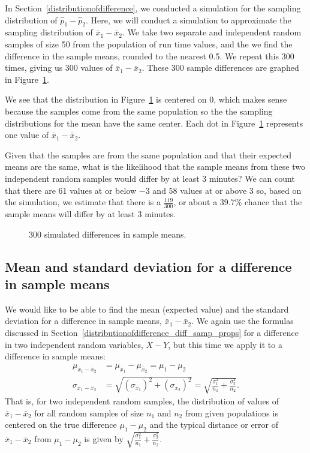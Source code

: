 In Section~\ref{distributionofdifference}, we conducted a simulation for the sampling distribution of $\hat{p}_1-\hat{p}_2$.  Here, we will conduct a simulation to approximate the sampling distribution of $\bar{x}_1 - \bar{x}_2$.  We take two separate and independent random samples of size 50 from the population of run time values, and the we find the difference in the sample means, rounded to the nearest 0.5.  We repeat this 300 times, giving us 300 values of  $\bar{x}_1 - \bar{x}_2$.  These 300 sample differences are graphed in Figure~\ref{diffmeanssimulation}.

We see that the distribution in Figure~\ref{diffmeanssimulation} is centered on 0, which makes sense because the samples come from the same population so the the sampling distributions for the mean have the same center.  Each dot in  Figure~\ref{diffmeanssimulation} represents one value of $\bar{x}_1 - \bar{x}_2$.  

Given that the samples are from the same population and that their expected means are the same, what is the likelihood that the sample means from these two independent random samples would differ by at least 3 minutes?  We can count that there are 61 values at or below $-3$ and 58 values at or above 3 so, based on the simulation, we estimate that there is a $\frac{119}{300}$, or about a 39.7\% chance that the sample means will differ by at least 3 minutes.  


\begin{figure}[h]
\centering
\caption{300 simulated differences in sample means.}
\label{diffmeanssimulation}
\end{figure}

\newpage
\subsection{Mean and standard deviation for a difference in sample means}

We would like to be able to find the mean (expected value) and the standard deviation for a difference in sample means, $\bar{x}_1 - \bar{x}_2$. We again use the formulas discussed in Section~\ref{distributionofdifference_diff_samp_props} for a difference in two independent random variables, $X - Y$, but this time we apply it to a difference in sample means:
\begin{align*}
\mu_{\bar{x}_1 - \bar{x}_2}
  &= \mu_{\bar{x}_1} - \mu_{\bar{x}_2} = \mu_1 - \mu_2 \\
\sigma_{\bar{x}_1 - \bar{x}_2}
  &= \sqrt{(\sigma_{\bar{x}_1})^2 + (\sigma_{\bar{x}_2})^2}
  =  \sqrt{\frac{\sigma_1^2}{n_1} + \frac{\sigma_2^2}{n_2}} .
\end{align*}
That is, for two independent random samples, the distribution of values of $\bar{x}_1 - \bar{x}_2$ for all random samples of size $n_1$ and $n_2$ from given populations is centered on the true difference $\mu_1-\mu_2$ and the typical distance or error of $\bar{x}_1 - \bar{x}_2$ from $\mu_1-\mu_2$ is given by $\sqrt{\frac{\sigma_1^2}{n_1} + \frac{\sigma_2^2}{n_2}}$.

